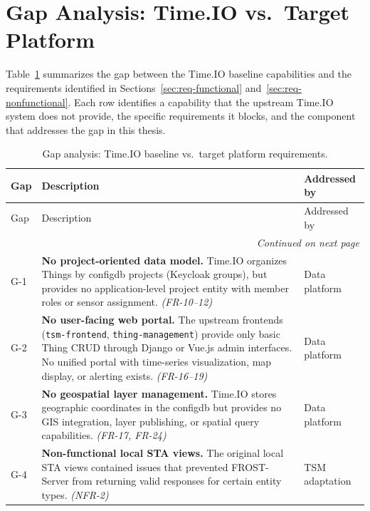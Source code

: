 \section{Gap Analysis: Time.IO vs.\ Target Platform}
\label{sec:req-gap}

Table~\ref{tab:gap-analysis} summarizes the gap between the Time.IO baseline capabilities and the
requirements identified in Sections~\ref{sec:req-functional} and~\ref{sec:req-nonfunctional}.
Each row identifies a capability that the upstream Time.IO system does not provide, the specific
requirements it blocks, and the component that addresses the gap in this thesis.

\begin{longtable}{l p{} l}
  \caption{Gap analysis: Time.IO baseline vs.\ target platform requirements.}
  \label{tab:gap-analysis} \\
  \toprule
  Gap & Description & Addressed by \\
  \midrule
  \endfirsthead
  \toprule
  Gap & Description & Addressed by \\
  \midrule
  \endhead
  \midrule
  \multicolumn{3}{r}{\emph{Continued on next page}} \\
  \endfoot
  \bottomrule
  \endlastfoot

  G-1 & \textbf{No project-oriented data model.} Time.IO organizes Things by
        configdb projects (Keycloak groups), but provides no application-level
        project entity with member roles or sensor assignment.
        \emph{(FR-10--12)} & Data platform \\[6pt]

  G-2 & \textbf{No user-facing web portal.} The upstream frontends
        (\texttt{tsm-frontend}, \texttt{thing-management}) provide only basic
        Thing CRUD through Django or Vue.js admin interfaces. No unified portal
        with time-series visualization, map display, or alerting exists.
        \emph{(FR-16--19)} & Data platform \\[6pt]

  G-3 & \textbf{No geospatial layer management.} Time.IO stores geographic
        coordinates in the configdb but provides no GIS integration, layer
        publishing, or spatial query capabilities.
        \emph{(FR-17, FR-24)} & Data platform \\[6pt]

  G-4 & \textbf{Non-functional local STA views.} The original local STA views
        contained issues that prevented FROST-Server from returning valid
        responses for certain entity types.
        \emph{(NFR-2)} & TSM adaptation \\[6pt]


\end{longtable}
